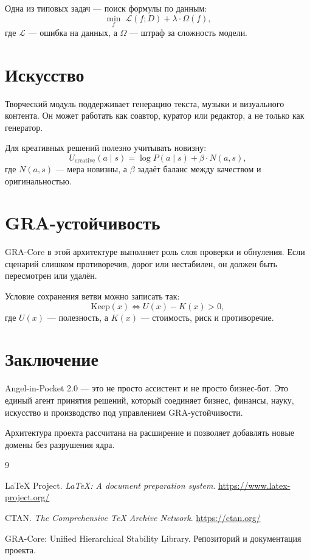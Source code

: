 \documentclass[11pt,a4paper]{article}
\begin{document}
Одна из типовых задач — поиск формулы по данным:
\[
\min_f \; \mathcal{L}(f; D) + \lambda \cdot \Omega(f),
\]
где $\mathcal{L}$ — ошибка на данных, а $\Omega$ — штраф за сложность модели.

\section{Искусство}

Творческий модуль поддерживает генерацию текста, музыки и визуального контента.  
Он может работать как соавтор, куратор или редактор, а не только как генератор.

Для креативных решений полезно учитывать новизну:
\[
U_{\text{creative}}(a \mid s) = \log P(a \mid s) + \beta \cdot N(a, s),
\]
где $N(a,s)$ — мера новизны, а $\beta$ задаёт баланс между качеством и оригинальностью.

\section{GRA-устойчивость}

GRA-Core в этой архитектуре выполняет роль слоя проверки и обнуления.  
Если сценарий слишком противоречив, дорог или нестабилен, он должен быть пересмотрен или удалён.

Условие сохранения ветви можно записать так:
\[
\text{Keep}(x) \iff U(x) - K(x) > 0,
\]
где $U(x)$ — полезность, а $K(x)$ — стоимость, риск и противоречие.

\section{Заключение}

Angel-in-Pocket 2.0 — это не просто ассистент и не просто бизнес-бот.  
Это единый агент принятия решений, который соединяет бизнес, финансы, науку, искусство и производство под управлением GRA-устойчивости.

Архитектура проекта рассчитана на расширение и позволяет добавлять новые домены без разрушения ядра.

\begin{thebibliography}{9}

LaTeX Project. \emph{LaTeX: A document preparation system}. \url{https://www.latex-project.org/}

CTAN. \emph{The Comprehensive TeX Archive Network}. \url{https://ctan.org/}

GRA-Core: Unified Hierarchical Stability Library. Репозиторий и документация проекта.

\end{thebibliography}
\end{document}
